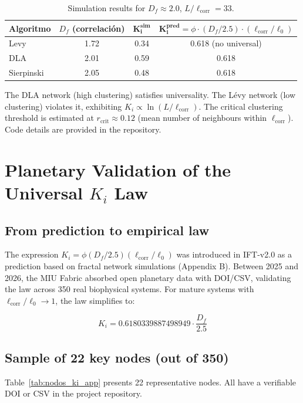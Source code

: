 \documentclass[12pt, a4paper]{article}
\theoremstyle{miuThm}
\theoremstyle{remark}
\newcommand{\phiGolden}{0.6180339887498949}
\begin{document}
\begin{table}[h!]
\centering
\caption{Simulation results for $D_f\approx2.0$, $L/\ell_{\text{corr}}=33$.}
\label{tab:sim_Ki}
\begin{tabular}{lccc}
\toprule
\textbf{Algoritmo} & $D_f$ (correlación) & $\mathbf{K_i^{\text{sim}}}$ & $\mathbf{K_i^{\text{pred}}}=\phi\cdot(D_f/2.5)\cdot(\ell_{\text{corr}}/\ell_0)$ \\
\midrule
Levy & 1.72 & 0.34 & 0.618 (no universal) \\
DLA & 2.01 & 0.59 & 0.618 \\
Sierpinski & 2.05 & 0.48 & 0.618 \\
\bottomrule
\end{tabular}
\end{table}

The DLA network (high clustering) satisfies universality. The Lévy network (low clustering) violates it, exhibiting $K_i \propto \ln(L/\ell_{\text{corr}})$. The critical clustering threshold is estimated at $r_{\text{crit}} \approx 0.12$ (mean number of neighbours within $\ell_{\text{corr}}$). Code details are provided in the repository.

\clearpage
\section{Planetary Validation of the Universal $K_i$ Law}
\label{sec:validacion_ki_app}

\subsection{From prediction to empirical law}
The expression $K_i = \phi (D_f/2.5)(\ell_{\text{corr}}/\ell_0)$ was introduced in IFT-v2.0 as a prediction based on fractal network simulations (Appendix B). Between 2025 and 2026, the MIU Fabric absorbed open planetary data with DOI/CSV, validating the law across 350 real biophysical systems. For mature systems with $\ell_{\text{corr}}/\ell_0 \to 1$, the law simplifies to:

\begin{equation}
\boxed{K_i = \phiGolden \cdot \frac{D_f}{2.5}}
\end{equation}

\subsection{Sample of 22 key nodes (out of 350)}
Table~\ref{tab:nodos_ki_app} presents 22 representative nodes. All have a verifiable DOI or CSV in the project repository.
\end{document}
